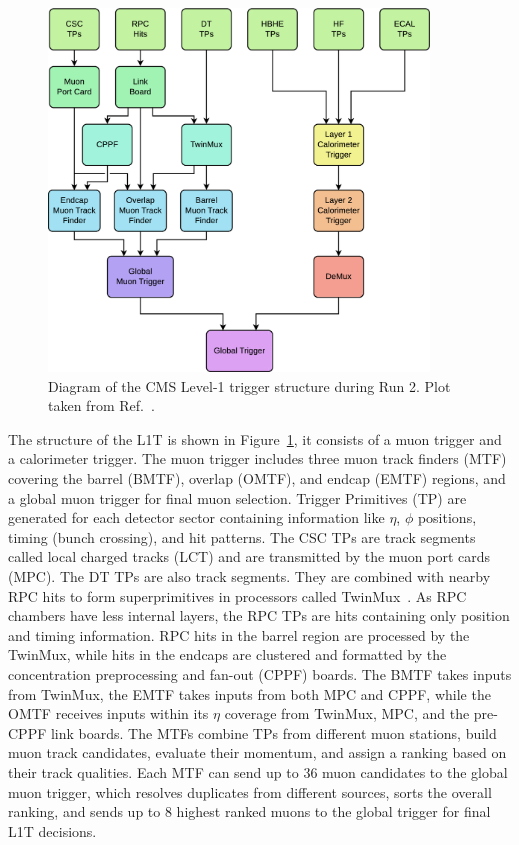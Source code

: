 \begin{figure}[!htb]
    \centering
    \includegraphics[width=0.90\textwidth]{pics/LHC_CMS/L1T.png}
    \caption{Diagram of the CMS Level-1 trigger structure during Run 2.
             Plot taken from Ref.~\cite{l1t_perform}.}
    \label{fig:cms_l1t}
\end{figure}

The structure of the L1T is shown in Figure~\ref{fig:cms_l1t}, 
it consists of a muon trigger and a calorimeter trigger.
The muon trigger includes three muon track finders (MTF) covering the barrel (BMTF), overlap (OMTF), and endcap (EMTF) regions,
and a global muon trigger for final muon selection. 
Trigger Primitives (TP) are generated for each detector sector containing information like $\eta$, $\phi$ positions, timing (bunch crossing), and hit patterns.
The CSC TPs are track segments called local charged tracks (LCT) and are transmitted by the muon port cards (MPC).
The DT TPs are also track segments. 
They are combined with nearby RPC hits to form superprimitives in processors called TwinMux~\cite{CMS-DP-2016-074}.
As RPC chambers have less internal layers, the RPC TPs are hits containing only position and timing information.
RPC hits in the barrel region are processed by the TwinMux, while hits in the endcaps are clustered and formatted by the concentration preprocessing and fan-out (CPPF) boards.
The BMTF takes inputs from TwinMux, the EMTF takes inputs from both MPC and CPPF, 
while the OMTF receives inputs within its $\eta$ coverage from TwinMux, MPC, and the pre-CPPF link boards.
The MTFs combine TPs from different muon stations, build muon track candidates, 
evaluate their momentum, and assign a ranking based on their track qualities.
Each MTF can send up to 36 muon candidates to the global muon trigger, 
which resolves duplicates from different sources, sorts the overall ranking, 
and sends up to 8 highest ranked muons to the global trigger for final L1T decisions.

